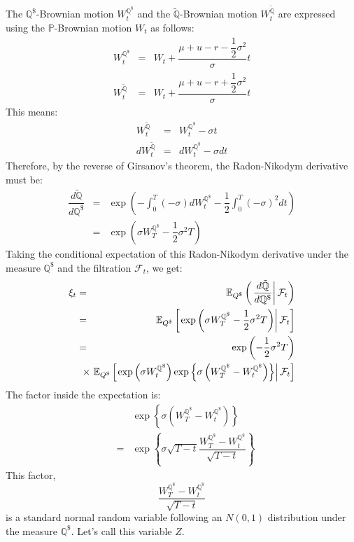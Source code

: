 \documentclass[uplatex,a4j,12pt,dvipdfmx]{jsarticle}
\begin{document}
The $\mathbb{Q}^{\$}$-Brownian motion $W^{\mathbb{Q}^{\$}}_{t}$ and the $\tilde{\mathbb{Q}}$-Brownian motion $W^{\tilde{\mathbb{Q}}}_{t}$ are expressed using the $\mathbb{P}$-Brownian motion $W_{t}$ as follows:
%
%
\begin{eqnarray*}
	W^{\mathbb{Q}^{\$}}_{t}
	&=&
	W_{t}
	+
	\dfrac{\mu + u -r - \dfrac{1}{2} \sigma^{2}}{\sigma} t
	\\
	W^{\tilde{\mathbb{Q}}}_{t}
	&=&
	W_{t}
	+
	\dfrac{\mu + u -r + \dfrac{1}{2} \sigma^{2}}{\sigma} t
\end{eqnarray*}
%
%
This means:
%
%
\begin{eqnarray*}
	W^{\tilde{\mathbb{Q}}}_{t}
	&=&
	W^{\mathbb{Q}^{\$}}_{t}
	-
	\sigma t
	\\
	d W^{\tilde{\mathbb{Q}}}_{t}
	&=&
	d W^{\mathbb{Q}^{\$}}_{t}
	-
	\sigma d t
\end{eqnarray*}
%
%
Therefore, by the reverse of Girsanov's theorem, the Radon-Nikodym derivative must be:
%
%
\begin{eqnarray*}
	\dfrac{d \tilde{\mathbb{Q}}}{d \mathbb{Q}^{\$}}
	&=&
	\exp
	\left(
	- \int^{T}_{0} (- \sigma) d W^{\mathbb{Q}^{\$}}_{t}
	- \dfrac{1}{2} \int^{T}_{0} ( - \sigma)^{2} d t
	\right)
	\\ &=&
	\exp
	\left(
	\sigma W^{\mathbb{Q}^{\$}}_{T}
	- \dfrac{1}{2} \sigma^{2} T
	\right)
\end{eqnarray*}
%
%
Taking the conditional expectation of this Radon-Nikodym derivative under the measure $\mathbb{Q}^{\$}$ and the filtration $\mathcal{F}_{t}$, we get:
%
%
\begin{eqnarray*}
	\xi_{t}
	&=&
	\mathbb{E}_{Q^{\$}}
	\left(
	\left.
	\dfrac{d \tilde{\mathbb{Q}}}{d \mathbb{Q}^{\$}}
	\right|
	\mathcal{F}_{t}
	\right)
	\\ &=&
	\mathbb{E}_{Q^{\$}}
	\left[
		\left.
		\exp
		\left(
		\sigma W^{\mathbb{Q}^{\$}}_{T}
		- \dfrac{1}{2} \sigma^{2} T
		\right)
		\right|
		\mathcal{F}_{t}
		\right]
	\\ &=&
	\exp
	\left(
	- \dfrac{1}{2} \sigma^{2} T
	\right)
	\\ && \hspace{-5mm} \times \
	\mathbb{E}_{Q^{\$}}
	\left[
		\left.
		\exp
		\left(
		\sigma W^{\mathbb{Q}^{\$}}_{t}
		\right)
		\exp
		\left\{
		\sigma
		\left(
		W^{\mathbb{Q}^{\$}}_{T} - W^{\mathbb{Q}^{\$}}_{t}
		\right)
		\right\}
		\right|
		\mathcal{F}_{t}
		\right]
\end{eqnarray*}
%
%
The factor inside the expectation is:
%
%
\begin{eqnarray*}
	&&
	\exp
	\left\{
	\sigma
	\left(
	W^{\mathbb{Q}^{\$}}_{T} - W^{\mathbb{Q}^{\$}}_{t}
	\right)
	\right\}
	\\ &=&
	\exp
	\left\{
	\sigma \sqrt{T-t}
	\dfrac{
		W^{\mathbb{Q}^{\$}}_{T} - W^{\mathbb{Q}^{\$}}_{t}
	}
	{
		\sqrt{T-t}
	}
	\right\}
\end{eqnarray*}
%
%
This factor,
$$
	\dfrac{
		W^{\mathbb{Q}^{\$}}_{T} - W^{\mathbb{Q}^{\$}}_{t}
	}
	{
		\sqrt{T-t}
	}
$$
is a standard normal random variable following an $N(0,1)$ distribution under the measure $\mathbb{Q}^{\$}$. Let's call this variable $Z$.
\end{document}
